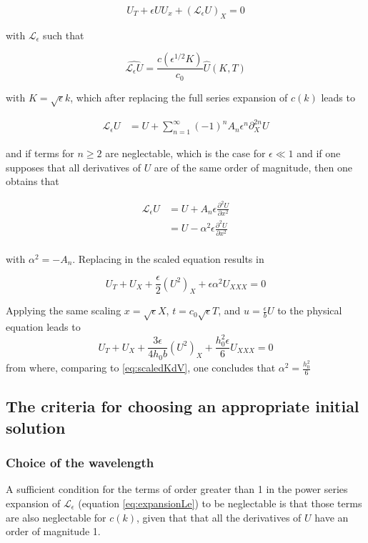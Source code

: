 $$ U_T + \epsilon U U_x+(\mathcal{L}_{\epsilon} U)_{X} = 0$$

\noindent with $\mathcal{L}_\epsilon$ such that 

$$ \widehat{\mathcal{L}_\epsilon U} = \frac{c(\epsilon^{1/2} K)}{c_0} \hat{U}(K,T)$$ 

\noindent with $K=\sqrt{\epsilon} k$, which after replacing the full series expansion of $c(k)$ leads to

\begin{align}
  \label{eq:expansionLe}
    \mathcal{L}_\epsilon U &=U +\sum_{n=1}^\infty (-1)^n A_n \epsilon^n \partial_X^{2n} U    
\end{align}

\noindent and if terms for $n\geq2$ are neglectable, which is the case for $\epsilon \ll 1 $ and if one supposes that all derivatives of $U$ are of the same order of magnitude, then one obtains that

\begin{align*}
    \mathcal{L}_\epsilon U &= U + A_n \epsilon \frac{\partial^2 U}{\partial x^2} \\
    &= U - \alpha^2 \epsilon \frac{\partial^2 U}{\partial x^2} \\
\end{align*}

\noindent with $\alpha^2 = - A_n$. Replacing in the scaled equation results in

$$U_T + U_X + \frac{\epsilon}{2} (U^2)_X + \epsilon\alpha^2U_{XXX} = 0$$

\indent Applying the same scaling $x=\sqrt{\epsilon} X$, $t =c_0 \sqrt{\epsilon} T$, and $u = \frac{\epsilon}{ b} U$ to the physical equation leads to $$U_T + U_X + \frac{3\epsilon}{4h_0b} (U^2)_X + \frac{h_0^2\epsilon}{6}U_{XXX} = 0$$
from where, comparing to \eqref{eq:scaledKdV}, one concludes that $ \alpha^2 = \frac{h_0^2}{6} $

\subsection{The criteria for choosing an appropriate initial solution}

\subsubsection{Choice of the wavelength}

\indent A sufficient condition for the terms of order greater than 1 in the power series expansion of $\mathcal{L}_\epsilon$  (equation \eqref{eq:expansionLe}) to be neglectable is that those terms are also neglectable for $c(k)$, given that that all the derivatives of $U$ have an order of magnitude 1.

